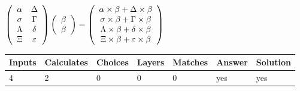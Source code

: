 \documentclass[12pt]{article}
\begin{document}
$  %
 \left( \begin{array}
 {
 c
 c
 }
 \alpha & 
 \Delta \\ 
 \sigma & 
 \Gamma \\ 
 \Lambda & 
 \delta \\ 
                    \Xi & 
 \varepsilon
 \end{array} \right)
 \left( \begin{array}
 {
 c
 }
 \beta \\ 
 \beta
 \end{array} \right)
=
 \left( \begin{array}
 {
 c
 }
  \alpha \times  \beta +  \Delta \times  \beta \\ 
  \sigma \times  \beta +  \Gamma \times  \beta \\ 
  \Lambda \times  \beta +  \delta \times  \beta \\ 
                     \Xi \times  \beta +  \varepsilon \times  \beta
 \end{array} \right)
$
 
 
 
\noindent{}
 
 

 
 
 
\noindent{}
 
 

 
 
\noindent{}
 
 

 
\vspace{0.3in}
   
   
   
   
\noindent\begin{tabular}{|l|l|l|l|l|l|l|}
 \hline
Inputs & Calculates & Choices & Layers & Matches & Answer & Solution \\ \hline
           4  & 
           2  & 
           0
  & 
           0  & 
           0  & 
  yes & 
  yes 
  \\ \hline
 \end{tabular}
   
   
   
   
\noindent{}
   
\end{document}
